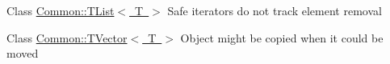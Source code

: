 
\begin{DoxyRefList}
\item[Class \mbox{\hyperlink{class_common_1_1_t_list}{Common\+::TList$<$ T $>$}} ]\label{bug__bug000001}%
%
Safe iterators do not track element removal  
\item[Class \mbox{\hyperlink{class_common_1_1_t_vector}{Common\+::TVector$<$ T $>$}} ]\label{bug__bug000002}%
%
Object might be copied when it could be moved 
\end{DoxyRefList}